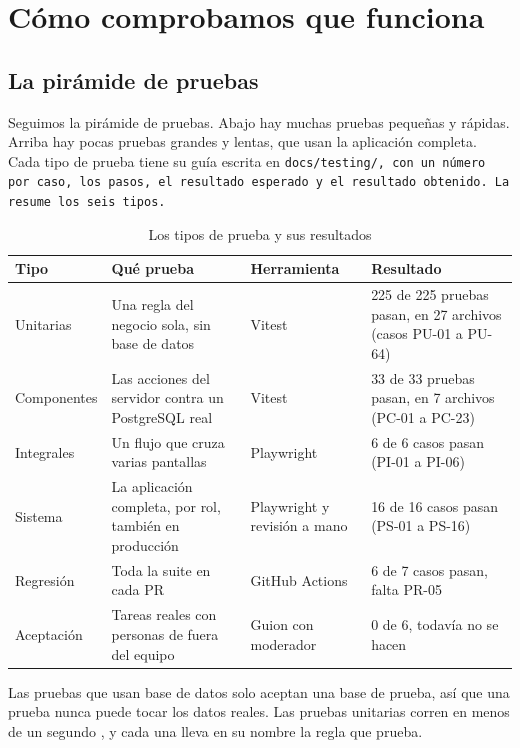 \FloatBarrier
\section{Cómo comprobamos que funciona}\label{sec:calidad}

\subsection{La pirámide de pruebas}\label{sec:piramide}

Seguimos la pirámide de pruebas. Abajo hay muchas pruebas pequeñas y rápidas. Arriba hay pocas pruebas grandes y lentas, que usan la aplicación completa. Cada tipo de prueba tiene su guía escrita en \tt{docs/testing/}, con un número por caso, los pasos, el resultado esperado y el resultado obtenido. La  resume los seis tipos.

\begin{table}[H]
  \centering
  \caption{Los tipos de prueba y sus resultados}\label{tab:pruebas}
  \small
  \begin{tabularx}{\linewidth}{@{}p{2.1cm}Xp{2.2cm}p{4.2cm}@{}}
    \toprule
    Tipo & Qué prueba & Herramienta & Resultado \\
    \midrule
    Unitarias & Una regla del negocio sola, sin base de datos & Vitest & 225 de 225 pruebas pasan, en 27 archivos (casos PU-01 a PU-64) \\
    Componentes & Las acciones del servidor contra un PostgreSQL real & Vitest & 33 de 33 pruebas pasan, en 7 archivos (PC-01 a PC-23) \\
    Integrales & Un flujo que cruza varias pantallas & Playwright & 6 de 6 casos pasan (PI-01 a PI-06) \\
    Sistema & La aplicación completa, por rol, también en producción & Playwright y revisión a mano & 16 de 16 casos pasan (PS-01 a PS-16) \\
    Regresión & Toda la suite en cada PR & GitHub Actions & 6 de 7 casos pasan, falta PR-05 \\
    Aceptación & Tareas reales con personas de fuera del equipo & Guion con moderador & 0 de 6, todavía no se hacen \\
    \bottomrule
  \end{tabularx}
\end{table}

Las pruebas que usan base de datos solo aceptan una base de prueba, así que una prueba nunca puede tocar los datos reales. Las pruebas unitarias corren en menos de un segundo \parencite{vitest}, y cada una lleva en su nombre la regla que prueba.

